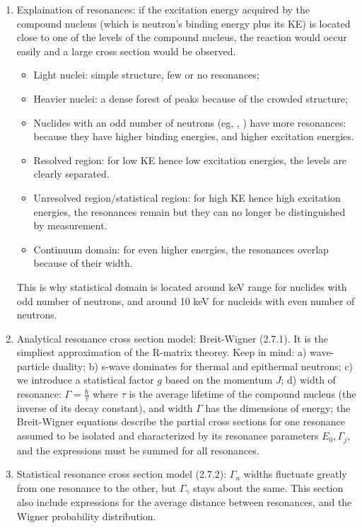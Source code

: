\documentclass{school-22.211-notes}
\begin{document}
\clearpage
\begin{enumerate}
\item Explaination of resonances: if the excitation energy acquired by the compound nucleus (which is neutron's binding energy plus its KE) is located close to one of the levels of the compound nucleus, the reaction would occur easily and a large cross section would be observed. 
  \begin{itemize}
  \item Light nuclei: simple structure, few or no resonances;
  \item Heavier nuclei: a dense forest of peaks because of the crowded structure;
  \item Nuclides with an odd number of neutrons (eg, , ) have more resonances: because they have higher binding energies, and higher excitation energies.
  \item Resolved region: for low KE hence low excitation energies, the levels are clearly separated. 
  \item Unresolved region/statistical region: for high KE hence high excitation energies, the resonances remain but they can no longer be distinguished by measurement. 
  \item Continuum domain: for even higher energies, the resonances overlap because of their width. 
  \end{itemize}
  This is why statistical domain is located around keV range for nuclides with odd number of neutrons, and around 10 keV for nucleids with even number of neutrons. 
\item Analytical resonance cross section model: Breit-Wigner (2.7.1). It is the simpliest approximation of the R-matrix theorey. Keep in mind: a) wave-particle duality; b) s-wave dominates for thermal and epithermal neutrons; c) we introduce a statistical factor $g$ based on the momentum $J$; d) width of resonance: $\Gamma = \frac{\hbar}{\tau}$ where $\tau$ is the average lifetime of the compound nucleus (the inverse of its decay constant), and width $\Gamma$ has the dimensions of energy; the Breit-Wigner equations describe the partial cross sections for one resonance assumed to be isolated and characterized by its resonance parameters $E_0, \Gamma_j$, and the expressions must be summed for all resonances. 
\item Statistical resonance cross section model (2.7.2): $\Gamma_n$ widths fluctuate greatly from one resonance to the other, but $\Gamma_{\gamma}$ stays about the same. This section also include expressions for the average distance between resonances, and the Wigner probability distribution. 

\end{enumerate}
\end{document}
